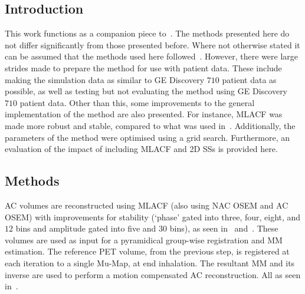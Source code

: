         \subsection{Introduction} \label{sec:evaluation_of_pet_ct_motion_correction_incorporating_motion_models_using_mlacf_and_complex_gating_schemes_introduction}
            This work functions as a companion piece to~. The methods presented here do not differ significantly from those presented before. Where not otherwise stated it can be assumed that the methods used here followed~. However, there were large strides made to prepare the method for use with patient data. These include making the simulation data as similar to \gls{GE} Discovery $710$ patient data as possible, as well as testing but not evaluating the method using \gls{GE} Discovery $710$ patient data. Other than this, some improvements to the general implementation of the method are also presented. For instance, \gls{MLACF} was made more robust and stable, compared to what was used in~. Additionally, the parameters of the method were optimised using a grid search. Furthermore, an evaluation of the impact of including \gls{MLACF} and \gls{2D} \glspl{SS} is provided here.
        
        \subsection{Methods} \label{sec:evaluation_of_pet_ct_motion_correction_incorporating_motion_models_using_mlacf_and_complex_gating_schemes_methods}
            \gls{AC} volumes are reconstructed using \gls{MLACF} (also using \gls{NAC} \gls{OSEM} and \gls{AC} \gls{OSEM}) with improvements for stability (`phase' gated into three, four, eight, and $12$ bins and amplitude gated into five and $30$ bins), as seen in~ and~. These volumes are used as input for a pyramidical group-wise registration and \gls{MM} estimation. The reference \gls{PET} volume, from the previous step, is registered at each iteration to a single \gls{Mu-Map}, at end inhalation. The resultant \gls{MM} and its inverse are used to perform a motion compensated \gls{AC} reconstruction. All as seen in~.
            
